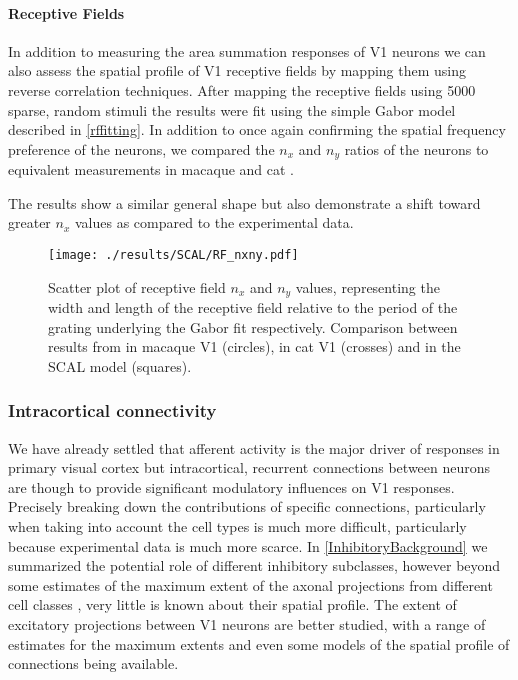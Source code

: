 \paragraph{Receptive Fields}

In addition to measuring the area summation responses of V1 neurons we
can also assess the spatial profile of V1 receptive fields by mapping
them using reverse correlation techniques. After mapping the receptive
fields using 5000 sparse, random stimuli the results were fit using
the simple Gabor model described in \ref{rffitting}. In addition to
once again confirming the spatial frequency preference of the neurons,
we compared the $n_x$ and $n_y$ ratios of the neurons to equivalent
measurements in macaque \citep{Ringach2002b} and cat
\citep{Jones1987}.

The results show a similar general shape but also demonstrate a shift
toward greater $n_x$ values as compared to the experimental data.

\begin{figure}
	\centering
        \texttt{[image: ./results/SCAL/RF\_nxny.pdf]}
	\caption[Relative elongation and width of V1 receptive fields. A
      comparison between SCAL, cat V1 \cite{Jones1987} and macaque V1
      \cite{Ringach2002b}.]{Scatter plot of receptive field $n_x$ and
      $n_y$ values, representing the width and length of the receptive
      field relative to the period of the grating underlying the Gabor
      fit respectively. Comparison between results from
      \cite{Ringach2002b} in macaque V1 (circles), \cite{Jones1987} in
      cat V1 (crosses) and in the SCAL model (squares).}
	\label{RFFits}
\end{figure}

\subsubsection{Intracortical connectivity}

We have already settled that afferent activity is the major driver of
responses in primary visual cortex but intracortical, recurrent
connections between neurons are though to provide significant
modulatory influences on V1 responses. Precisely breaking down the
contributions of specific connections, particularly when taking into
account the cell types is much more difficult, particularly because
experimental data is much more scarce. In \ref{InhibitoryBackground}
we summarized the potential role of different inhibitory subclasses,
however beyond some estimates of the maximum extent of the axonal
projections from different cell classes \citep{Kisvarday1993,
  Kisvarday1997a, Budd2001, Buzas2001}, very little is known about
their spatial profile. The extent of excitatory projections between V1
neurons are better studied, with a range of estimates for the maximum
extents \citep{Angelucci2002} and even some models of the spatial
profile of connections \citep{Buzas2006} being available.

